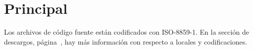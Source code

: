 \section{Principal}

Los archivos de código fuente están codificados con ISO-8859-1. En la
sección de descargos, página~\pageref{sec:descargos}, hay más información
con respecto a locales y codificaciones.




